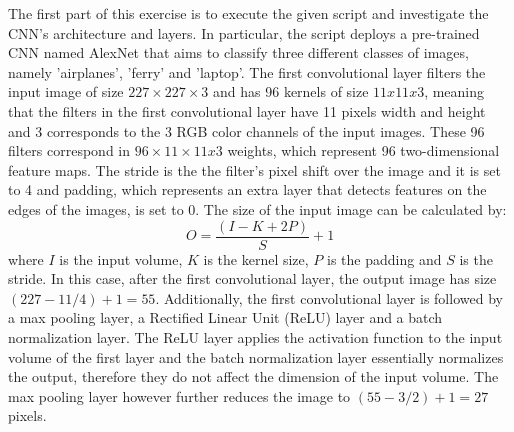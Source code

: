 \documentclass[11pt,conference,compsoc]{IEEEtran}
\begin{document}
The first part of this exercise is to execute the given script and investigate the CNN's architecture and layers. In particular, the script deploys a pre-trained CNN named AlexNet that aims to classify three different classes of images, namely 'airplanes', 'ferry' and 'laptop'. The first convolutional layer filters the input image of size $227 \times 227 \times 3$ and has 96 kernels of size $11 x 11 x 3$, meaning that the filters in the first convolutional layer have 11 pixels width and height and 3 corresponds to the 3 RGB color channels of the input images. These 96 filters correspond in $96 \times 11 \times 11 x3$ weights, which represent 96 two-dimensional feature maps. The stride is the the filter's pixel shift over the image and it is set to 4 and padding, which represents an extra layer that detects features on the edges of the images, is set to 0. The size of the input image can be calculated by: 
\begin{equation}
 O = \frac{  (I - K + 2P)}{S} + 1
\end{equation}
where $I$ is the input volume, $K$ is the kernel size, $P$ is the padding and $S$ is the stride. In this case, after the first convolutional layer, the output image has size $(227 - 11 /4) + 1 = 55$. Additionally, the first convolutional layer is followed by a max pooling layer, a Rectified Linear Unit (ReLU) layer and a batch normalization layer. The ReLU layer applies the activation function to the input volume of the first layer and the batch normalization layer essentially normalizes the output, therefore they do not affect the dimension of the input volume. The max pooling layer however further reduces the image to $(55 - 3 /2) + 1 = 27$ pixels. 
\end{document}
